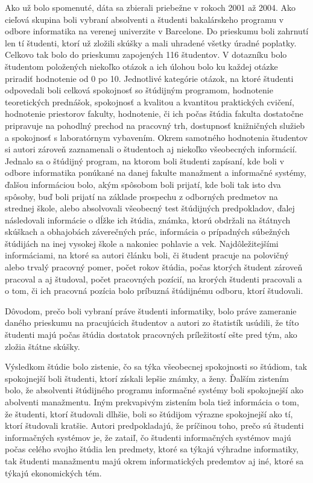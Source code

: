 Ako už bolo spomenuté, dáta sa zbierali priebežne v rokoch 2001 až 2004. Ako cieľová skupina boli vybraní absolventi a študenti bakalárskeho programu v odbore informatika na verenej univerzite v Barcelone. Do prieskumu boli zahrnutí len tí študenti, ktorí už zložili skúšky a mali uhradené všetky úradné poplatky. Celkovo tak bolo do prieskumu zapojených 116 študentov. V dotazníku bolo študentom položených niekoľko otázok a ich úlohou bolo ku každej otázke priradiť hodnotenie od 0 po 10. Jednotlivé kategórie otázok, na ktoré študenti odpovedali boli celková spokojnosť so štúdijným programom, hodnotenie teoretických prednášok, spokojnosť a kvalitou a kvantitou praktických cvičení, hodnotenie priestorov fakulty, hodnotenie, či ich počas štúdia fakulta dostatočne pripravuje na pohodlný prechod na pracovný trh, dostupnosť knižničných služieb a spokojnosť s laboratórnym vybavením. Okrem samotného hodnotenia študentov si autori zároveň zaznamenali o študentoch aj niekoľko všeobecných informácií. Jednalo sa o štúdijný program, na ktorom boli študenti zapísaní, kde boli v odbore informatika ponúkané na danej fakulte manažment a informačné systémy, ďalšou informáciou bolo, akým spôsobom boli prijatí, kde boli tak isto dva spôsoby, buď boli prijatí na základe prospechu z odborných predmetov na strednej škole, alebo absolvovali všeobecný test štúdijných predpokladov, ďalej následovali informácie o dĺžke ich štúdia, známka, ktorú obdržali na štátnych skúškach a obhajobách záverečných prác, informácia o prípadných súbežných štúdijách na inej vysokej škole a nakoniec pohlavie a vek. Najdôležitejšími informáciami, na ktoré sa autori článku boli, či študent pracuje na polovičný alebo trvalý pracovný pomer, počet rokov štúdia, počas ktorých študent zároveň pracoval a aj študoval, počet pracovných pozícií, na krorých študenti pracovali a o tom, či ich pracovná pozícia bolo príbuzná štúdijnému odboru, ktorí študovali.

Dôvodom, prečo boli vybraní práve študenti informatiky, bolo práve zameranie daného prieskumu na pracujúcich študentov a autori zo štatistík usúdili, že títo študenti majú počas štúdia dostatok pracovných príležitostí ešte pred tým, ako zložia štátne skúšky.

Výsledkom štúdie bolo zistenie, čo sa týka všeobecnej spokojnosti so štúdiom, tak spokojnejší boli študenti, ktorí získali lepšie známky, a ženy. Ďalším zistením bolo, že absolventi štúdijného programu informačné systémy boli spokojnejší ako abolventi manažmentu. Iným prekvapivým zistením bola tiež informácia o tom, že študenti, ktorí študovali dlhšie, boli so štúdijom výrazne spokojnejší ako tí, ktorí študovali kratšie. Autori predpokladajú, že príčinou toho, prečo sú študenti informačných systémov je, že zataiľ, čo študenti informačných systémov majú počas celého svojho štúdia len predmety, ktoré sa týkajú výhradne informatiky, tak študenti manažmentu majú okrem informatických predemtov aj iné, ktoré sa týkajú ekonomických tém.

